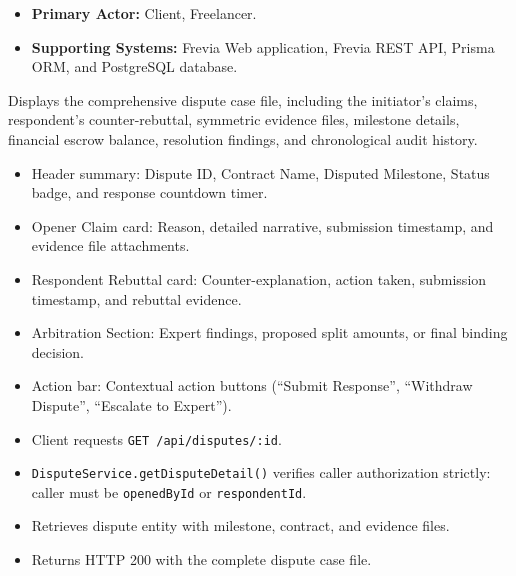 
\begin{itemize}[leftmargin=1.6em,topsep=3pt,itemsep=2pt,parsep=0pt,label=$\bullet$]
      \item \textbf{Primary Actor:} Client, Freelancer.
      \item \textbf{Supporting Systems:} Frevia Web application, Frevia REST API, Prisma ORM, and PostgreSQL database.
\end{itemize}

\noindent Displays the comprehensive dispute case file, including the initiator's claims, respondent's counter-rebuttal, symmetric evidence files, milestone details, financial escrow balance, resolution findings, and chronological audit history.

\begin{itemize}[leftmargin=1.6em,topsep=3pt,itemsep=2pt,parsep=0pt,label=$\bullet$]
      \item Header summary: Dispute ID, Contract Name, Disputed Milestone, Status badge, and response countdown timer.
      \item Opener Claim card: Reason, detailed narrative, submission timestamp, and evidence file attachments.
      \item Respondent Rebuttal card: Counter-explanation, action taken, submission timestamp, and rebuttal evidence.
      \item Arbitration Section: Expert findings, proposed split amounts, or final binding decision.
      \item Action bar: Contextual action buttons (``Submit Response'', ``Withdraw Dispute'', ``Escalate to Expert'').
\end{itemize}

\begin{itemize}[leftmargin=1.6em,topsep=3pt,itemsep=2pt,parsep=0pt,label=$\bullet$]
      \item Client requests \texttt{GET /\allowbreak{}api/\allowbreak{}disputes/\allowbreak{}:\allowbreak{}id}.
      \item \texttt{DisputeService.getDisputeDetail()} verifies caller authorization strictly: caller must be \texttt{openedById} or \texttt{respondentId}.
      \item Retrieves dispute entity with milestone, contract, and evidence files.
      \item Returns HTTP 200 with the complete dispute case file.
\end{itemize}

